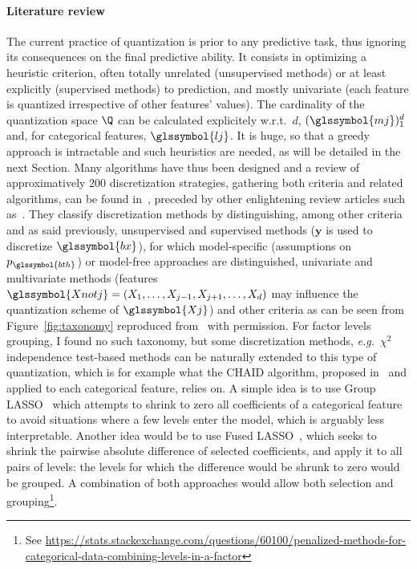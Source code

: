 \paragraph{Literature review}

The current practice of quantization is prior to any predictive task, thus ignoring its consequences on the final predictive ability. It consists in optimizing a heuristic criterion, often totally unrelated (unsupervised methods) or at least explicitly (supervised methods) to prediction, and mostly univariate (each feature is quantized irrespective of other features' values). The cardinality of the quantization space $\Q$ can be calculated explicitely w.r.t.\ $d$, $(\glssymbol{mj})_1^d$ and, for categorical features, $\glssymbol{lj}$. It is huge, so that a greedy approach is intractable and such heuristics are needed, as will be detailed in the next Section.
Many algorithms have thus been designed and a review of approximatively 200 discretization strategies, gathering both criteria and related algorithms, can be found in~\cite{ramirez2016data}, preceded by other enlightening review articles such as~\cite{dougherty1995supervised,liu2002discretization}. They classify discretization methods by distinguishing, among other criteria and as said previously, unsupervised and supervised methods ($\bm{y}$ is used to discretize $\glssymbol{bx}$), for which model-specific (assumptions on $p_{\glssymbol{bth}}$) or model-free approaches are distinguished, univariate and multivariate methods (features $\glssymbol{Xnotj} = (X_{1},\ldots,X_{j-1},X_{j+1},\ldots,X_{d})$ may influence the quantization scheme of $\glssymbol{Xj}$) and other criteria as can be seen from Figure~\ref{fig:taxonomy} reproduced from~\cite{ramirez2016data} with permission. For factor levels grouping, I found no such taxonomy, but some discretization methods, \textit{e.g.}\ $\chi^2$ independence test-based methods can be naturally extended to this type of quantization, which is for example what the CHAID algorithm, proposed in~\cite{kass1980exploratory} and applied to each categorical feature, relies on. A simple idea is to use Group LASSO~\cite{meier2008group} which attempts to shrink to zero all coefficients of a categorical feature to avoid situations where a few levels enter the model, which is arguably less interpretable. Another idea would be to use Fused LASSO~\cite{tibshirani2005sparsity}, which seeks to shrink the pairwise absolute difference of selected coefficients, and apply it to all pairs of levels: the levels for which the difference would be shrunk to zero would be grouped. A combination of both approaches would allow both selection and grouping\footnote{See \url{https://stats.stackexchange.com/questions/60100/penalized-methods-for-categorical-data-combining-levels-in-a-factor}}.

